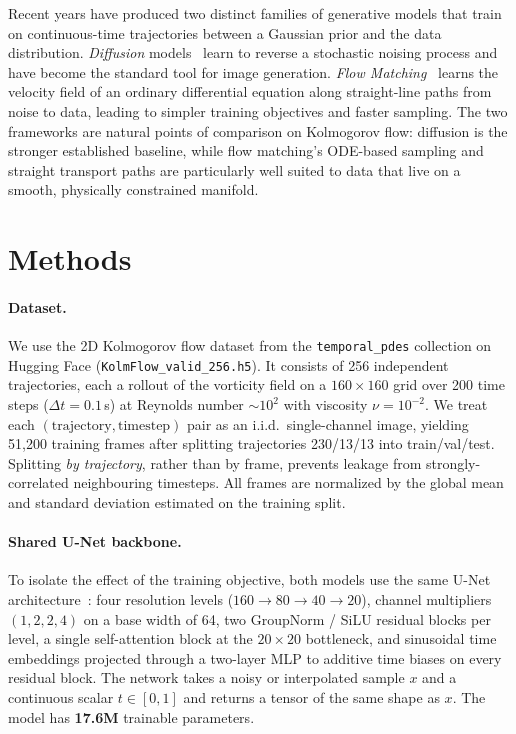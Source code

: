 \documentclass{article}
\begin{document}
Recent years have produced two distinct families of generative models that
train on continuous-time trajectories between a Gaussian prior and the data
distribution. \emph{Diffusion} models~\cite{ho2020ddpm} learn to reverse a
stochastic noising process and have become the standard tool for image
generation. \emph{Flow Matching}~\cite{lipman2023flow} learns the velocity
field of an ordinary differential equation along straight-line paths from
noise to data, leading to simpler training objectives and faster sampling.
The two frameworks are natural points of comparison on Kolmogorov flow:
diffusion is the stronger established baseline, while flow matching's
ODE-based sampling and straight transport paths are particularly well suited
to data that live on a smooth, physically constrained manifold.

\section{Methods}

\paragraph{Dataset.} We use the 2D Kolmogorov flow dataset from the
\texttt{temporal\_pdes} collection on Hugging Face
(\texttt{KolmFlow\_valid\_256.h5}). It consists of 256 independent
trajectories, each a rollout of the vorticity field on a $160\times160$ grid
over 200 time steps ($\Delta t = 0.1$\,s) at Reynolds number $\sim\!10^2$ with
viscosity $\nu = 10^{-2}$. We treat each $(\text{trajectory},\text{timestep})$
pair as an i.i.d.\ single-channel image, yielding 51{,}200 training frames
after splitting trajectories 230/13/13 into train/val/test. Splitting
\emph{by trajectory}, rather than by frame, prevents leakage from
strongly-correlated neighbouring timesteps. All frames are normalized by the
global mean and standard deviation estimated on the training split.

\paragraph{Shared U-Net backbone.} To isolate the effect of the training
objective, both models use the same U-Net architecture~\cite{ronneberger2015unet}:
four resolution levels ($160\to 80\to 40\to 20$), channel multipliers
$(1,2,2,4)$ on a base width of 64, two GroupNorm / SiLU residual blocks per
level, a single self-attention block at the $20\times20$ bottleneck, and
sinusoidal time embeddings projected through a two-layer MLP to additive
time biases on every residual block. The network takes a noisy or
interpolated sample $x$ and a continuous scalar $t\in[0,1]$ and returns a
tensor of the same shape as $x$. The model has \textbf{17.6M} trainable
parameters.
\end{document}
